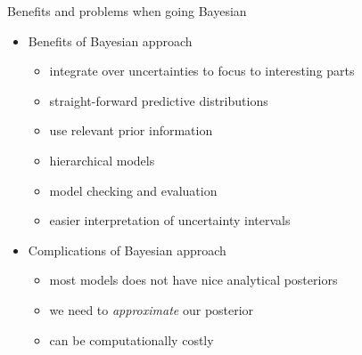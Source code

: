 \documentclass[10pt]{beamer}
\begin{document}


\begin{frame}{Benefits and problems when going Bayesian}

  \begin{itemize}
  \item Benefits of Bayesian approach
    \begin{itemize}
    \item integrate over uncertainties to focus to interesting parts
    \item straight-forward predictive distributions
    \item use relevant prior information
    \item hierarchical models
    \item model checking and evaluation
    \item easier interpretation of uncertainty intervals
    \end{itemize}
    \pause
  \item Complications of Bayesian approach
    \begin{itemize}
    \item most models does not have nice analytical posteriors
    \item we need to \emph{approximate} our posterior
    \item can be computationally costly
    \end{itemize}
  \end{itemize}
\end{frame}
\end{document}
